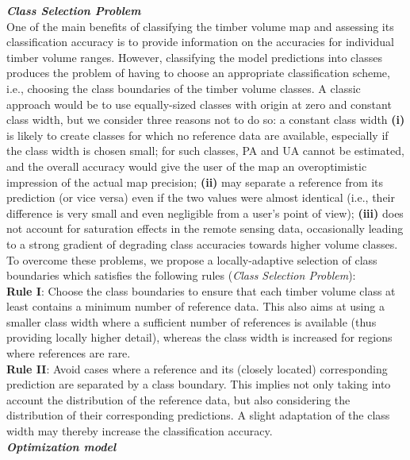 \textit{\textbf{Class Selection Problem}}\\

One of the main benefits of classifying the timber volume map and assessing its classification accuracy is to provide information on the accuracies for individual timber volume ranges. However, classifying the model predictions into classes produces the problem of having to choose an appropriate classification scheme, i.e., choosing the class boundaries of the timber volume classes. A classic approach would be to use equally-sized classes with origin at zero and constant class width, but we consider three reasons not to do so: a constant class width \textbf{(i)} is likely to create classes for which no reference data are available, especially if the class width is chosen small; for such classes, PA and UA cannot be estimated, and the overall accuracy would give the user of the map an overoptimistic impression of the actual map precision; \textbf{(ii)} may separate a reference from its prediction (or vice versa) even if the two values were almost identical (i.e., their difference is very small and even negligible from a user's point of view); \textbf{(iii)} does not account for saturation effects in the remote sensing data, occasionally leading to a strong gradient of degrading class accuracies towards higher volume classes. To overcome these problems, we propose a locally-adaptive selection of class boundaries which satisfies the following rules (\textit{Class Selection Problem}):\\

\textbf{Rule I}: Choose the class boundaries to ensure that each timber volume class at least contains a minimum number of reference data. This also aims at using a smaller class width where a sufficient number of references is available (thus providing locally higher detail), whereas the class width is increased for regions where references are rare.\\

\textbf{Rule II}: Avoid cases where a reference and its (closely located) corresponding prediction are separated by a class boundary. This implies not only taking into account the distribution of the reference data, but also considering the distribution of their corresponding predictions. A slight adaptation of the class width may thereby increase the classification accuracy.\\

\textit{\textbf{Optimization model}}\\


